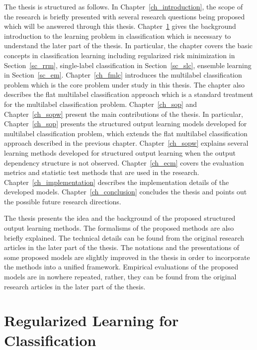 The thesis is structured as follows.
In Chapter~\ref{ch_introduction}, the scope of the research is briefly presented with several research questions being proposed which will be answered through this thesis.
Chapter~\ref{ch_rlc} gives the background introduction to the learning problem in classification which is necessary to understand the later part of the thesis.
In particular, the chapter covers the basic concepts in classification learning including regularized risk minimization in Section~\ref{sc_rrm}, single-label classification in Section~\ref{sc_slc}, ensemble learning in Section~\ref{sc_em}.
Chapter~\ref{ch_fmlc} introduces the multilabel classification problem which is the core problem under study in this thesis.
The chapter also describes the flat multilabel classification approach which is a standard treatment for the multilabel classification problem.
Chapter~\ref{ch_sop} and Chapter~\ref{ch_sopw} present the main contributions of the thesis.
In particular, Chapter~\ref{ch_sop} presents the structured output learning models developed for multilabel classification problem, which extends the flat multilabel classification approach described in the previous chapter.
Chapter~\ref{ch_sopw} explains several learning methods developed for structured output learning when the output dependency structure is not observed.
Chapter~\ref{ch_ecm} covers the evaluation metrics and statistic test methods that are used in the research.
Chapter~\ref{ch_implementation} describes the implementation details of the developed models.
Chapter~\ref{ch_conclusion} concludes the thesis and points out the possible future research directions.

The thesis presents the idea and the background of the proposed structured output learning methods.
The formalisms of the proposed methods are also briefly explained.
The technical details can be found from the original research articles in the later part of the thesis.
The notations and the presentations of some proposed models are slightly improved in the thesis in order to incorporate the methods into a unified framework.
Empirical evaluations of the proposed models are in nowhere repeated, rather, they can be found from the original research articles in the later part of the thesis.



%
%
%
\chapter{Regularized Learning for Classification} \label{ch_rlc}



